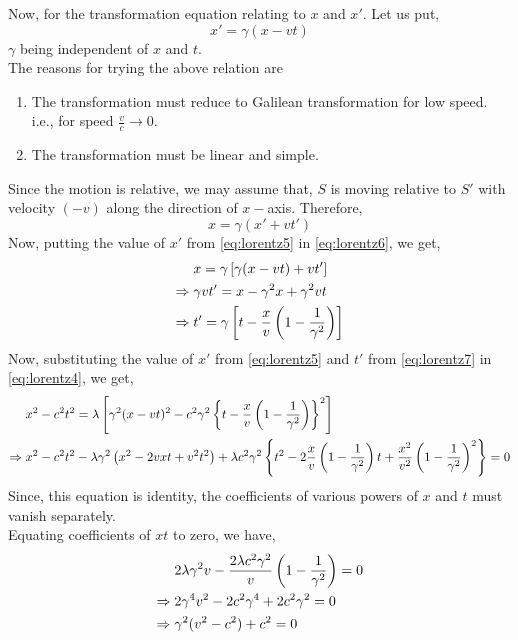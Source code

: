 \documentclass[../main-sheet.tex]{subfiles}
\begin{document}
Now, for the transformation equation relating to \(x \) and \(x'\). Let us put,
\begin{equation}
    x'=\gamma(x-vt)\label{eq:lorentz5}
\end{equation}
\(\gamma\) being independent of \(x \) and \(t\).\\
The reasons for trying the above relation are
\begin{enumerate}[label=(\roman*)]
    \item The transformation must reduce to Galilean transformation for low speed. i.e., for speed \(\frac{v }{c }\to 0\).
    \item The transformation must be linear and simple.
\end{enumerate}
Since the motion is relative, we may assume that, \(S \) is moving relative to \(S' \) with velocity \((-v )\) along the direction of \(x-\)axis. Therefore,
\begin{equation}
    x=\gamma(x'+vt')\label{eq:lorentz6}
\end{equation}
Now, putting the value of \(x' \) from \eqref{eq:lorentz5} in \eqref{eq:lorentz6}, we get,
\begin{align}
    &x=\gamma\left[ \gamma(x-vt)+vt' \right]\notag\\
    \Rightarrow\;&\gamma vt'=x-\gamma^2x+\gamma^2 vt\notag\\
    \Rightarrow\;&t'=\gamma\left[t-\frac{x }{v }\left( 1-\frac{1}{\gamma^2} \right)\right]\label{eq:lorentz7}
\end{align}
Now, substituting the value of \(x' \) from \eqref{eq:lorentz5} and \(t'\) from \eqref{eq:lorentz7} in \eqref{eq:lorentz4}, we get,
\begin{align}
    &x^2-c^2t^2=\lambda\left[ \gamma^2(x-vt)^2-c^2\gamma^2\left\{ t-\frac{x }{v }\left( 1-\frac{1}{\gamma^2} \right) \right\}^2\right]\notag\\
    \Rightarrow\;&x^2-c^2t^2-\lambda\gamma^2\left(x^2-2vxt+v^2t^2 \right)+\lambda c^2\gamma^2\left\{ t^2-2\frac{x }{v }\left( 1-\frac{1}{\gamma^2} \right)t+\frac{x^2 }{v^2}\left( 1-\frac{1}{\gamma^2} \right)^2 \right\}=0\label{eq:lorentz8}
\end{align}
Since, this equation is identity, the coefficients of various powers of \(x \) and \(t \) must vanish separately.\\
Equating coefficients of \(xt \) to zero, we have,
\begin{align}
    &2\lambda \gamma^2v-\frac{2\lambda c^2\gamma^2}{v}\left( 1-\frac{1}{\gamma^2} \right)=0\notag\\
    \Rightarrow\;&2\gamma^4 v^2-2c^2\gamma^4+2c^2\gamma^2=0\notag\\
    \Rightarrow\;&\gamma^2 (v^2-c^2)+c^2=0\label{eq:lorentz9}
\end{align}
\end{document}
